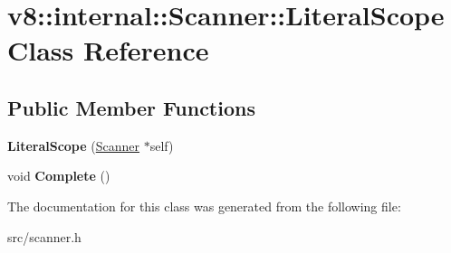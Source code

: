\hypertarget{classv8_1_1internal_1_1_scanner_1_1_literal_scope}{}\section{v8\+:\+:internal\+:\+:Scanner\+:\+:Literal\+Scope Class Reference}
\label{classv8_1_1internal_1_1_scanner_1_1_literal_scope}
\subsection*{Public Member Functions}
\begin{DoxyCompactItemize}
\item 
\hypertarget{classv8_1_1internal_1_1_scanner_1_1_literal_scope_a41aa10c53be0e4c538f7e39128ba93bb}{}{\bfseries Literal\+Scope} (\hyperlink{classv8_1_1internal_1_1_scanner}{Scanner} $\ast$self)\label{classv8_1_1internal_1_1_scanner_1_1_literal_scope_a41aa10c53be0e4c538f7e39128ba93bb}

\item 
\hypertarget{classv8_1_1internal_1_1_scanner_1_1_literal_scope_a32e54a0a93bc5d28e060494e8006c858}{}void {\bfseries Complete} ()\label{classv8_1_1internal_1_1_scanner_1_1_literal_scope_a32e54a0a93bc5d28e060494e8006c858}

\end{DoxyCompactItemize}


The documentation for this class was generated from the following file\+:\begin{DoxyCompactItemize}
\item 
src/scanner.\+h\end{DoxyCompactItemize}
